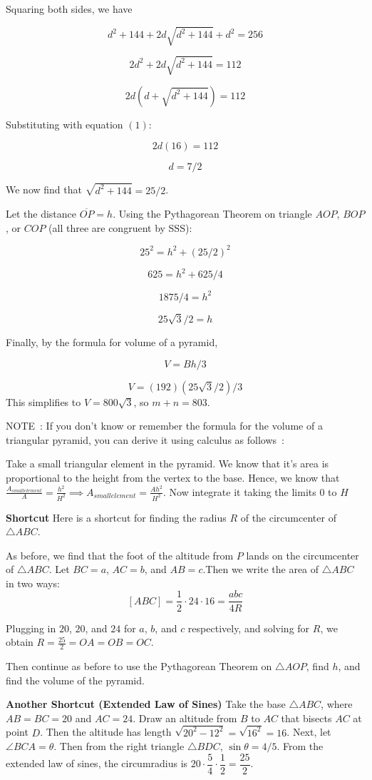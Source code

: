 \begin{enumerate}
 Squaring both sides, we have

 
 \[d^2 + 144 + 2d\sqrt {d^2+144} + d^2 = 256\]

 \[2d^2 + 2d\sqrt {d^2+144} = 112\]

 \[2d(d + \sqrt {d^2+144}) = 112\]

 Substituting with equation $(1)$:

 
 \[2d(16) = 112\]

 \[d = 7/2\]

 We now find that $\sqrt{d^2 + 144} = 25/2$.

 Let the distance $\overline {OP} = h$. Using the Pythagorean Theorem on triangle $AOP$, $BOP$, or $COP$ (all three are congruent by SSS):

 
 \[25^2 = h^2 + (25/2)^2\]

 \[625 = h^2 + 625/4\]

 \[1875/4 = h^2\]

 \[25\sqrt {3} / 2 = h\]

 
Finally, by the formula for volume of a pyramid,

 
 \[V = Bh/3\]

 \[V = (192)(25\sqrt{3}/2)/3\]This simplifies to $V = 800\sqrt {3}$, so $m+n = \boxed {803}$.

 
NOTE : If you don’t know or remember the formula for the volume of a triangular pyramid, you can derive it using calculus as follows :

 Take a small triangular element in the pyramid. We know that it’s area is proportional to the height from the vertex to the base. Hence, we know that $\frac{A_{small element}}{A} = \frac{h^2}{H^2} \implies A_{small element} = \frac{Ah^2}{H^2}$. Now integrate it taking the limits $0$ to $H$

 \textbf{Shortcut} Here is a shortcut for finding the radius $R$ of the circumcenter of $\triangle ABC$.

 As before, we find that the foot of the altitude from $P$ lands on the circumcenter of $\triangle ABC$. Let $BC=a$, $AC=b$, and $AB=c$.Then we write the area of $\triangle ABC$ in two ways:
 \[[ABC]= \frac{1}{2} \cdot 24 \cdot 16 = \frac{abc}{4R}\]

 Plugging in $20$, $20$, and $24$ for $a$, $b$, and $c$ respectively, and solving for $R$, we obtain $R= \frac{25}{2}=OA=OB=OC$.

 Then continue as before to use the Pythagorean Theorem on $\triangle AOP$, find $h$, and find the volume of the pyramid.

 \textbf{Another Shortcut (Extended Law of Sines)} Take the base $\triangle ABC$, where $AB = BC = 20$ and $AC = 24$. Draw an altitude from $B$ to $AC$ that bisects $AC$ at point $D$. Then the altitude has length $\sqrt{20^2 - 12^2} = \sqrt{16^2} = 16$. Next, let $\angle BCA = \theta$. Then from the right triangle $\triangle BDC$, $\sin \theta = 4/5$. From the extended law of sines, the circumradius is $20 \cdot \dfrac{5}{4} \cdot \dfrac{1}{2} = \dfrac{25}{2}$.


\end{enumerate}
